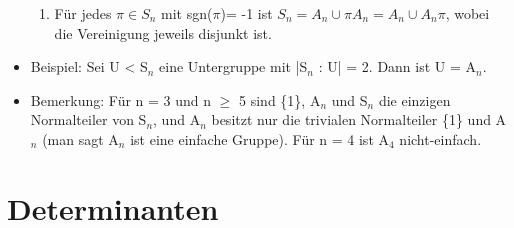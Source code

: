 \begin{itemize}
\begin{enumerate}
\item Für jedes $\pi \in S_n$ mit sgn($\pi$)= -1 ist $S_n = A_n \cup \pi A_n = A_n \cup A_n \pi$, wobei die Vereinigung jeweils disjunkt ist.
\end{enumerate}
\item Beispiel: Sei U < S$_n$ eine Untergruppe mit |S$_n$ : U| = 2. Dann ist U = A$_n$.
\item Bemerkung: Für n = 3 und n $\ge$ 5 sind \{1\}, A$_n$ und S$_n$ die einzigen Normalteiler von S$_n$, und A$_n$ besitzt nur die trivialen Normalteiler \{1\} und A$_n$ (man sagt A$_n$ ist eine einfache Gruppe). Für n = 4 ist A$_4$ nicht-einfach.
\end{itemize}

\section{Determinanten}
